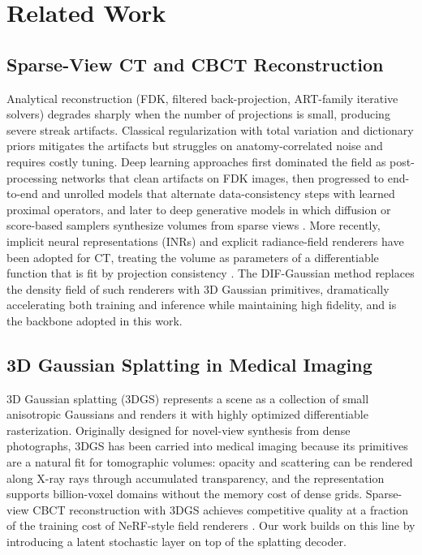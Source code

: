 
\section{Related Work}
\label{sec:rel}

\subsection{Sparse-View CT and CBCT Reconstruction}
\label{sec:rel:cbct}

Analytical reconstruction (FDK, filtered back-projection, ART-family
iterative solvers) degrades sharply when the number of projections is
small, producing severe streak artifacts. Classical regularization with
total variation and dictionary priors mitigates the artifacts but
struggles on anatomy-correlated noise and requires costly tuning.
Deep learning approaches first dominated the field as post-processing
networks that clean artifacts on FDK images, then progressed to
end-to-end and unrolled models that alternate data-consistency steps
with learned proximal operators, and later to deep generative models in
which diffusion or score-based samplers synthesize volumes from sparse
views \cite{song2021scorebased}. More recently, implicit neural
representations (INRs) and explicit radiance-field renderers have been
adopted for CT, treating the volume as parameters of a differentiable
function that is fit by projection consistency \cite{mildenhall2020nerf}.
The DIF-Gaussian method \cite{lin2024difgaussian} replaces the density
field of such renderers with 3D Gaussian primitives, dramatically
accelerating both training and inference while maintaining high
fidelity, and is the backbone adopted in this work.

\subsection{3D Gaussian Splatting in Medical Imaging}
\label{sec:rel:3dgs}

3D Gaussian splatting (3DGS) \cite{kerbl2023gaussiansplats} represents a
scene as a collection of small anisotropic Gaussians and renders it with
highly optimized differentiable rasterization. Originally designed for
novel-view synthesis from dense photographs, 3DGS has been carried into
medical imaging because its primitives are a natural fit for tomographic
volumes: opacity and scattering can be rendered along X-ray rays through
accumulated transparency, and the representation supports billion-voxel
domains without the memory cost of dense grids. Sparse-view CBCT
reconstruction with 3DGS achieves competitive quality at a fraction of
the training cost of NeRF-style field renderers \cite{lin2024difgaussian}.
Our work builds on this line by introducing a latent
stochastic layer on top of the splatting decoder.

